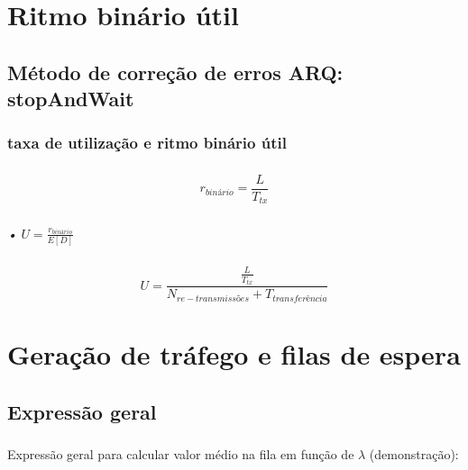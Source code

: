 \documentclass[13pt,a4paper]{report}
\begin{document}
\chapter{Ritmo binário útil}


\section{Método de correção de erros ARQ: stopAndWait}

\subsection{taxa de utilização e ritmo binário útil}

\paragraph{}
\begin{Large}
\begin{equation}
r_{binário} = \frac{L}{T_{tx}}
\end{equation}
\end{Large}	

\paragraph{}
\emph{•} $U = \frac{r_{binário}}{E[D]}$

\paragraph{}
\begin{Large}
\begin{equation}
U = \frac{\frac{L}{T_{tx}}}{N_{re-transmissões} + T_{transferência}}
\end{equation}
\end{Large}	

\chapter{Geração de tráfego e filas de espera}

\section{Expressão geral}

\paragraph{}
Expressão geral para calcular valor médio na fila em função de $\lambda$ (demonstração):
\end{document}

